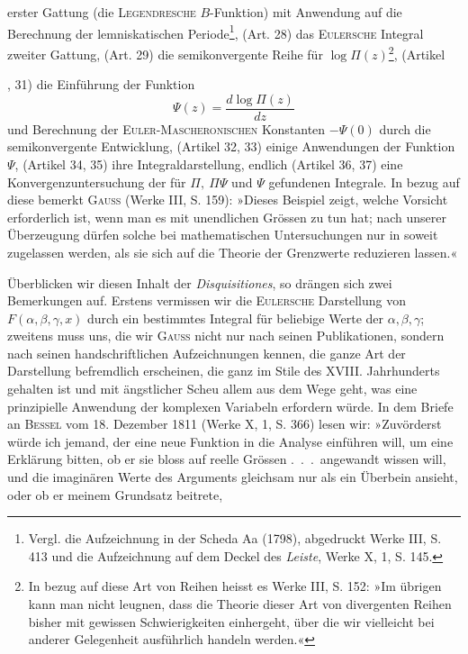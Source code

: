 erster Gattung (die \textsc{Legendresche} \(B\)-Funktion) mit Anwendung auf die Berechnung
der lemniskatischen Periode\footnote{Vergl. die Aufzeichnung in der Scheda Aa (1798), abgedruckt Werke III, S. 413 und die Aufzeichnung auf dem Deckel des \textit{Leiste}, Werke X, 1, S. 145.}, (Art. 28) das \textsc{Eulersche} Integral
zweiter Gattung, (Art. 29) die semikonvergente Reihe für \(\log\Pi(z)\)\footnote{In bezug auf diese Art von Reihen heisst es Werke III, S. 152: »Im übrigen kann man nicht leugnen, dass die Theorie dieser Art von divergenten Reihen bisher mit gewissen Schwierigkeiten einhergeht, über die wir vielleicht bei anderer Gelegenheit ausführlich handeln werden.«}, (Artikel\par
\clearpage{}
, 31) die Einführung der Funktion
\[
\Psi(z)=\frac{d\log\Pi(z)}{dz}
\]
und Berechnung der \textsc{Euler-Mascheronischen} Konstanten \(-\Psi(0)\) durch die
semikonvergente Entwicklung, (Artikel 32, 33) einige Anwendungen der Funktion
\(\Psi\), (Artikel 34, 35) ihre Integraldarstellung, endlich (Artikel 36, 37) eine
Konvergenzuntersuchung der für \(\Pi,\ \Pi\Psi\) und \(\Psi\) gefundenen Integrale. In bezug
auf diese bemerkt \textsc{Gauss} (Werke III, S. 159): »Dieses Beispiel zeigt,
welche Vorsicht erforderlich ist, wenn man es mit unendlichen Grössen zu
tun hat; nach unserer Überzeugung dürfen solche bei mathematischen Untersuchungen
nur in soweit zugelassen werden, als sie sich auf die Theorie der
Grenzwerte reduzieren lassen.«
\par
Überblicken wir diesen Inhalt der \textit{Disquisitiones}, so drängen sich zwei
Bemerkungen auf. Erstens vermissen wir die \textsc{Eulersche} Darstellung von
\(F(\alpha,\beta,\gamma,x)\) durch ein bestimmtes Integral für beliebige Werte der \(\alpha,\beta,\gamma\);
zweitens muss uns, die wir \textsc{Gauss} nicht nur nach seinen Publikationen, sondern
nach seinen handschriftlichen Aufzeichnungen kennen, die ganze Art
der Darstellung befremdlich erscheinen, die ganz im Stile des XVIII. Jahrhunderts
gehalten ist und mit ängstlicher Scheu allem aus dem Wege geht,
was eine prinzipielle Anwendung der komplexen Variabeln erfordern würde.
In dem Briefe an \textsc{Bessel} vom 18. Dezember 1811 (Werke X, 1, S. 366) lesen
wir: »Zuvörderst würde ich jemand, der eine neue Funktion in die Analyse
einführen will, um eine Erklärung bitten, ob er sie bloss auf reelle Grössen
\mbox{.\ .\ .}\ angewandt wissen will, und die imaginären Werte des Arguments gleichsam
nur als ein Überbein ansieht, oder ob er meinem Grundsatz beitrete,

